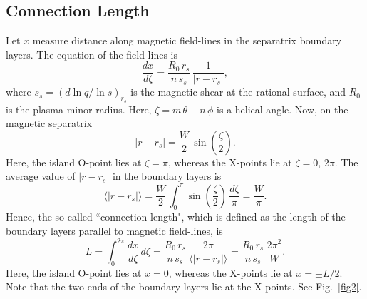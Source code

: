 \documentclass[12pt,prb,aps]{revtex4-1}
\begin{document}
\subsection{Connection Length}
Let $x$ measure distance along magnetic field-lines in the separatrix boundary layers. The equation of the field-lines is\,\cite{rf}
\begin{equation}
\frac{dx}{d\zeta} =\frac{R_0\,r_s}{n\,s_s}\,\frac{1}{|r-r_s|},
\end{equation}
where $s_s = (d\ln q/\ln s)_{r_s}$ is the magnetic shear at the rational surface, and $R_0$ is the plasma minor radius. Here, $\zeta=m\,\theta-n\,\phi$ is a helical angle. 
 Now, on the magnetic separatrix\,\cite{rf}
\begin{equation}
|r-r_s| = \frac{W}{2}\,\sin\left(\frac{\zeta}{2}\right).
\end{equation}
Here, the island O-point lies at $\zeta=\pi$, whereas the X-points lie at $\zeta=0$, $2\pi$. The average value of $|r-r_s|$ in the boundary layers is
\begin{equation}
\langle |r-r_s|\rangle  =\frac{W}{2}\,\int_0^\pi \sin\left(\frac{\zeta}{2}\right)\,\frac{d\zeta}{\pi}= \frac{W}{\pi}.
\end{equation}
Hence, the so-called ``connection length", which is defined as the length of the boundary layers parallel to magnetic field-lines, is
\begin{equation}
L = \int_0^{2\pi}\frac{dx}{d\zeta}\,d\zeta = \frac{R_0\,r_s}{n\,s_s}\,\frac{2\pi}{\langle|r-r_s|\rangle} = \frac{R_0\,r_s}{n\,s_s}\,\frac{2\pi^2}{W}.
\end{equation}
Here, the island O-point lies at $x=0$, whereas the X-points lie at $x=\pm L/2$. Note that the two ends of the boundary layers lie at the X-points. See Fig.~\ref{fig2}.
\end{document}

